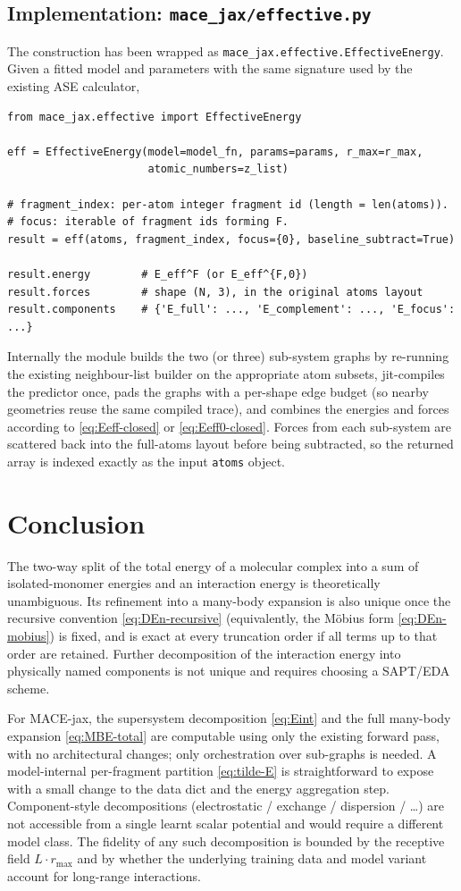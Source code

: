 \documentclass[11pt,a4paper]{article}
\newcommand{\rmax}{r_{\mathrm{max}}}
\begin{document}
\subsection{Implementation: \texttt{mace\_jax/effective.py}}

The construction has been wrapped as \texttt{mace\_jax.effective.EffectiveEnergy}.
Given a fitted model and parameters with the same signature used by the
existing ASE calculator,
\begin{verbatim}
from mace_jax.effective import EffectiveEnergy

eff = EffectiveEnergy(model=model_fn, params=params, r_max=r_max,
                      atomic_numbers=z_list)

# fragment_index: per-atom integer fragment id (length = len(atoms)).
# focus: iterable of fragment ids forming F.
result = eff(atoms, fragment_index, focus={0}, baseline_subtract=True)

result.energy        # E_eff^F (or E_eff^{F,0})
result.forces        # shape (N, 3), in the original atoms layout
result.components    # {'E_full': ..., 'E_complement': ..., 'E_focus': ...}
\end{verbatim}
Internally the module builds the two (or three) sub-system graphs by
re-running the existing neighbour-list builder on the appropriate atom
subsets, jit-compiles the predictor once, pads the graphs with a per-shape
edge budget (so nearby geometries reuse the same compiled trace), and
combines the energies and forces according to \cref{eq:Eeff-closed} or
\cref{eq:Eeff0-closed}. Forces from each sub-system are scattered back into
the full-atoms layout before being subtracted, so the returned array is
indexed exactly as the input \texttt{atoms} object.

\section{Conclusion}

The two-way split of the total energy of a molecular complex into a sum of
isolated-monomer energies and an interaction energy is theoretically
unambiguous. Its refinement into a many-body expansion is also unique once the
recursive convention \cref{eq:DEn-recursive} (equivalently, the M\"obius form
\cref{eq:DEn-mobius}) is fixed, and is exact at every truncation order if all
terms up to that order are retained. Further decomposition of the interaction
energy into physically named components is not unique and requires choosing a
SAPT/EDA scheme.

For \textsc{MACE}-jax, the supersystem decomposition \cref{eq:Eint} and the
full many-body expansion \cref{eq:MBE-total} are computable using only the
existing forward pass, with no architectural changes; only orchestration over
sub-graphs is needed. A model-internal per-fragment partition
\cref{eq:tilde-E} is straightforward to expose with a small change to the data
dict and the energy aggregation step. Component-style decompositions
(electrostatic / exchange / dispersion / \ldots) are not accessible from a
single learnt scalar potential and would require a different model class. The
fidelity of any such decomposition is bounded by the receptive field
$L \cdot \rmax$ and by whether the underlying training data and model variant
account for long-range interactions.
\end{document}
